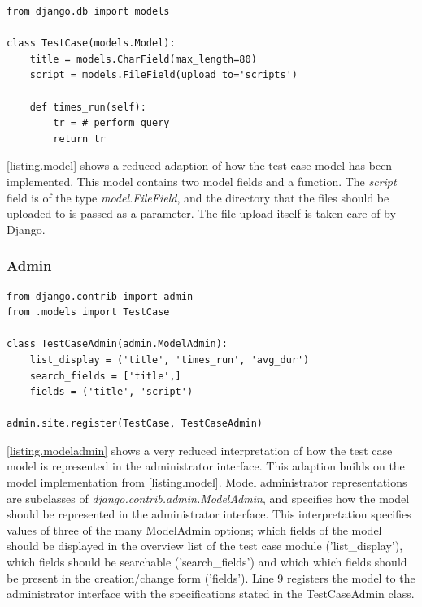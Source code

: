 \vspace{4mm}
\begin{lstlisting}[caption=Model Implementation, label={listing.model}]
from django.db import models
 
class TestCase(models.Model):
    title = models.CharField(max_length=80)
    script = models.FileField(upload_to='scripts')
    
    def times_run(self):
        tr = # perform query
        return tr
\end{lstlisting}

\noindent \lstlistingname \space \ref{listing.model} shows a reduced adaption of how the test case model has been implemented. This model contains two model fields and a function. The \emph{script} field is of the type \emph{model.FileField}, and the directory that the files should be uploaded to is passed as a parameter. The file upload itself is taken care of by Django.





\subsubsection{Admin}


\vspace{4mm}
\begin{lstlisting}[caption=Implementation of Model in Administrator Interface, label={listing.modeladmin}]
from django.contrib import admin
from .models import TestCase

class TestCaseAdmin(admin.ModelAdmin):
    list_display = ('title', 'times_run', 'avg_dur')
    search_fields = ['title',]
    fields = ('title', 'script')
 
admin.site.register(TestCase, TestCaseAdmin)
\end{lstlisting}

\noindent \lstlistingname \space \ref{listing.modeladmin} shows a very reduced interpretation of how the test case model is represented in the administrator interface. This adaption builds on the model implementation from \lstlistingname \space \ref{listing.model}. Model administrator representations are subclasses of \emph{django.contrib.admin.ModelAdmin}, and specifies how the model should be represented in the administrator interface. This interpretation specifies values of three of the many ModelAdmin options; which fields of the model should be displayed in the overview list of the test case module ('list\_display'), which fields should be searchable ('search\_fields') and which which fields should be present in the creation/change form ('fields'). Line 9 registers the model to the administrator interface with the specifications stated in the TestCaseAdmin class.

